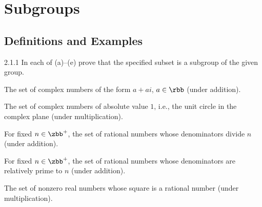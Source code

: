 \section{Subgroups}

\subsection{Definitions and Examples}

\begin{exercise}{2.1.1}
    In each of (a)--(e) prove that the specified subset is a subgroup of the given group.
    \begin{subexercises}
        \item The set of complex numbers of the form $a + ai$, $a \in \rbb$ (under addition).
        \item The set of complex numbers of absolute value $1$, i.e., the unit circle in the complex plane (under multiplication).
        \item For fixed $n \in \zbb^+$, the set of rational numbers whose denominators divide $n$ (under addition).
        \item For fixed $n \in \zbb^+$, the set of rational numbers whose denominators are relatively prime to $n$ (under addition).
        \item The set of nonzero real numbers whose square is a rational number (under multiplication).
    \end{subexercises}
\end{exercise}

